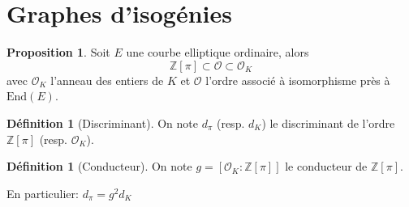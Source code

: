 \documentclass[10pt,a4paper]{beamer}
\theoremstyle{plain}
\theoremstyle{definition}
\theoremstyle{definition}
\theoremstyle{definition}
\newtheorem{prop}[thm]{Proposition}
\theoremstyle{definition}
\newtheorem{defi}[thm]{Définition}
\theoremstyle{remark}
\theoremstyle{remark}
\theoremstyle{definition}
\begin{document}
\begin{frame}

\end{frame}
\section{Graphes d'isogénies}



%
%
%

\begin{frame}

\begin{prop}
Soit $E$ une courbe elliptique ordinaire, alors 
\[
\mathbb{Z} \left[ \pi \right] \subset \mathcal{O} \subset \mathcal{O}_K
\] 
avec $\mathcal{O}_K$ l'anneau des entiers de $K$ et $\mathcal{O}$ l'ordre 
associé à isomorphisme près à $\mathrm{End}(E)$. %
\end{prop}

\begin{defi}[Discriminant]
On note $d_{\pi}$ (resp. $d_K$) le discriminant de l'ordre $\mathbb{Z}\left[ \pi \right]$ (resp. $\mathcal{O}_K$).
\end{defi}

\begin{defi}[Conducteur]
On note $g=[\mathcal{O}_K:\mathbb{Z}[\pi]]$ le conducteur de $\mathbb{Z}[\pi]$. %
\end{defi}

En particulier: $d_{\pi}=g^2d_K$

\end{frame}
\end{document}
